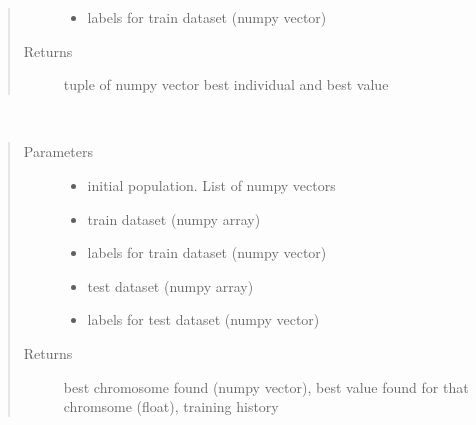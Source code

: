\documentclass[letterpaper,10pt,english]{sphinxmanual}
\begin{document}
\begin{fulllineitems}
\begin{fulllineitems}
\begin{quote}
\begin{description}
\begin{itemize}
\item {} 
 \textendash{} labels for train dataset (numpy vector)

\end{itemize}

\item[{Returns}] \leavevmode
tuple of numpy vector best individual and best value

\end{description}\end{quote}

\end{fulllineitems}


\begin{fulllineitems}
\label{\detokenize{index:genetic_optimizer.GeneticRegularizator.fit}}~\begin{quote}\begin{description}
\item[{Parameters}] \leavevmode\begin{itemize}
\item {} 
 \textendash{} initial population. List of numpy vectors

\item {} 
 \textendash{} train dataset (numpy array)

\item {} 
 \textendash{} labels for train dataset (numpy vector)

\item {} 
 \textendash{} test dataset (numpy array)

\item {} 
 \textendash{} labels for test dataset (numpy vector)

\end{itemize}

\item[{Returns}] \leavevmode
best chromosome found (numpy vector), best value found for that chromsome (float), training history


\end{description}
\end{quote}
\end{fulllineitems}
\end{fulllineitems}
\end{document}
